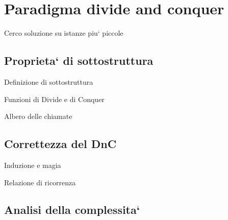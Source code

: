 \section{Paradigma divide and conquer}

Cerco soluzione su istanze piu` piccole

\subsection{Proprieta` di sottostruttura}

Definizione di sottostruttura

Funzioni di Divide e di Conquer

Albero delle chiamate

\subsection{Correttezza del DnC}

Induzione e magia

Relazione di ricorrenza

\subsection{Analisi della complessita`}
